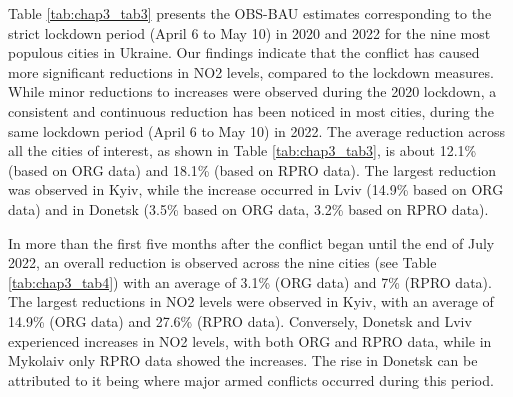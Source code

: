 Table \ref{tab:chap3_tab3} presents the OBS-BAU estimates corresponding to the strict lockdown period (April 6 to May 10) in 2020 and 2022 for the nine most populous cities in Ukraine. Our findings indicate that the conflict has caused more significant reductions in NO2 levels, compared to the lockdown measures. While minor reductions to increases were observed during the 2020 lockdown, a consistent and continuous reduction has been noticed in most cities, during the same lockdown period (April 6 to May 10) in 2022. The average reduction across all the cities of interest, as shown in Table \ref{tab:chap3_tab3}, is about 12.1\% (based on ORG data) and 18.1\% (based on RPRO data). The largest reduction was observed in Kyiv, while the increase occurred in Lviv (14.9\% based on ORG data) and in Donetsk (3.5\% based on ORG data, 3.2\% based on RPRO data).\par

In more than the first five months after the conflict began until the end of July 2022, an overall reduction is observed across the nine cities (see Table \ref{tab:chap3_tab4}) with an average of 3.1\% (ORG data) and 7\% (RPRO data). The largest reductions in NO2 levels were observed in Kyiv, with an average of 14.9\% (ORG data) and 27.6\% (RPRO data). Conversely, Donetsk and Lviv experienced increases in NO2 levels, with both ORG and RPRO data, while in Mykolaiv only RPRO data showed the increases. The rise in Donetsk can be attributed to it being where major armed conflicts occurred during this period.\par
